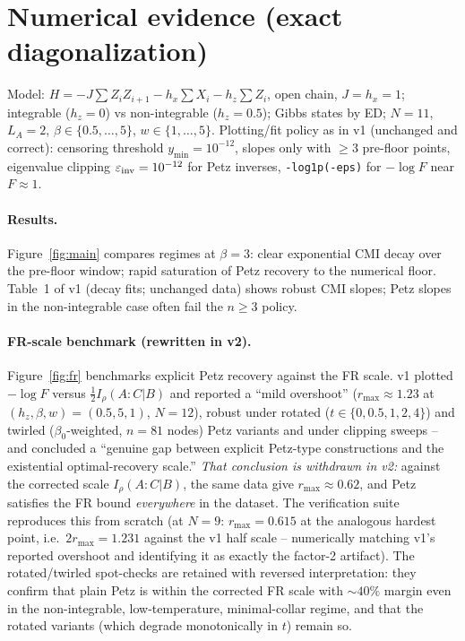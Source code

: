 \documentclass[11pt]{article}
\theoremstyle{remark}
\begin{document}
\section{Numerical evidence (exact diagonalization)}
\label{sec:results}
Model: $H = -J\sum Z_iZ_{i+1} - h_x\sum X_i - h_z\sum Z_i$, open chain,
$J = h_x = 1$; integrable ($h_z = 0$) vs non-integrable ($h_z = 0.5$);
Gibbs states by ED; $N = 11$, $L_A = 2$, $\beta \in \{0.5,\dots,5\}$,
$w \in \{1,\dots,5\}$. Plotting/fit policy as in v1 (unchanged and
correct): censoring threshold $y_{\min} = 10^{-12}$, slopes only with
$\ge 3$ pre-floor points, eigenvalue clipping $\varepsilon_{\rm inv} =
10^{-12}$ for Petz inverses, \texttt{-log1p(-eps)} for $-\log F$ near
$F \approx 1$.

\paragraph{Results.} Figure~\ref{fig:main} compares regimes at $\beta =
3$: clear exponential CMI decay over the pre-floor window; rapid
saturation of Petz recovery to the numerical floor. Table~1 of v1 (decay
fits; unchanged data) shows robust CMI slopes; Petz slopes in the
non-integrable case often fail the $n \ge 3$ policy.

\paragraph{FR-scale benchmark (rewritten in v2).} Figure~\ref{fig:fr}
benchmarks explicit Petz recovery against the FR scale. v1 plotted
$-\log F$ versus $\tfrac12 I_\rho(A:C|B)$ and reported a ``mild
overshoot'' ($r_{\max} \approx 1.23$ at $(h_z,\beta,w) = (0.5, 5, 1)$,
$N = 12$), robust under rotated ($t \in \{0, 0.5, 1, 2, 4\}$) and twirled
($\beta_0$-weighted, $n = 81$ nodes) Petz variants and under clipping
sweeps -- and concluded a ``genuine gap between explicit Petz-type
constructions and the existential optimal-recovery scale.'' \emph{That
conclusion is withdrawn in v2:} against the corrected scale
$I_\rho(A:C|B)$, the same data give $r_{\max} \approx 0.62$, and Petz
satisfies the FR bound \emph{everywhere} in the dataset. The verification
suite reproduces this from scratch (at $N = 9$: $r_{\max} = 0.615$ at the
analogous hardest point, i.e.\ $2 r_{\max} = 1.231$ against the v1 half
scale -- numerically matching v1's reported overshoot and identifying it
as exactly the factor-2 artifact). The rotated/twirled spot-checks are
retained with reversed interpretation: they confirm that plain Petz is
within the corrected FR scale with $\sim 40\%$ margin even in the
non-integrable, low-temperature, minimal-collar regime, and that the
rotated variants (which degrade monotonically in $t$) remain so.
\end{document}
